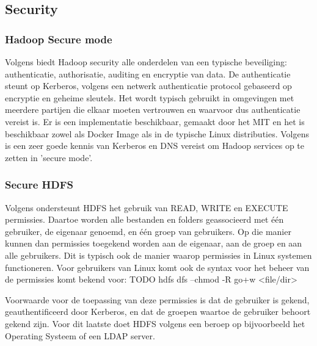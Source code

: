 \subsection{Security}

\subsubsection{Hadoop Secure mode}
Volgens \textcite{Kiran2022} biedt Hadoop security alle onderdelen van een typische beveiliging: authenticatie, authorisatie, auditing en encryptie van data.
De authenticatie steunt op Kerberos, volgens \textcite{Kerberos2023} een netwerk authenticatie protocol gebaseerd op encryptie en geheime sleutels. Het wordt typisch gebruikt in omgevingen met meerdere partijen die elkaar moeten vertrouwen en waarvoor dus authenticatie vereist is. Er is een implementatie beschikbaar, gemaakt door het MIT en het is beschikbaar zowel als Docker Image als in de typische Linux distributies.
\newline
Volgens \textcite{Hadoop2023} is een zeer goede kennis van Kerberos en DNS vereist om Hadoop services op te zetten in 'secure mode'.
\newline
\newline

\subsubsection{Secure HDFS}
Volgens \textcite{Hadoop2023b} ondersteunt HDFS het gebruik van READ, WRITE en EXECUTE permissies. Daartoe worden alle bestanden en folders geassocieerd met één gebruiker, de eigenaar genoemd, en één groep van gebruikers.
Op die manier kunnen dan permissies toegekend worden aan de eigenaar, aan de groep en aan alle gebruikers. Dit is typisch ook de manier waarop permissies in Linux systemen functioneren.
\newline
Voor gebruikers van Linux komt ook de syntax voor het beheer van de permissies komt bekend voor:
TODO
hdfs dfs –chmod -R go+w <file/dir>

\newline
Voorwaarde voor de toepassing van deze permissies is dat de gebruiker is gekend, geauthentificeerd door Kerberos, en dat de groepen waartoe de gebruiker behoort gekend zijn. Voor dit laatste doet HDFS volgens \textcite{Hadoop2023c} een beroep op bijvoorbeeld het Operating Systeem of een LDAP server.


